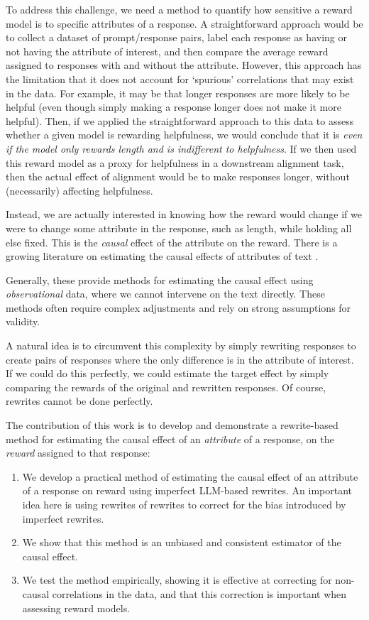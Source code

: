 \documentclass{article}
\begin{document}
To address this challenge, we need a method to quantify how sensitive a reward model is to specific attributes of a response.
A straightforward approach would be to collect a dataset of prompt/response pairs, label each response as having or not having the attribute of interest, and then compare the average reward assigned to responses with and without the attribute. However, this approach has the limitation that it does not account for `spurious' correlations that may exist in the data. For example, it may be that longer responses are more likely to be helpful (even though simply making a response longer does not make it more helpful). Then, if we applied the straightforward approach to this data to assess whether a given model is rewarding helpfulness, we would conclude that it is \emph{even if the model only rewards length and is indifferent to helpfulness}. If we then used this reward model as a proxy for helpfulness in a downstream alignment task, then the actual effect of alignment would be to make responses longer, without (necessarily) affecting helpfulness.

Instead, we are actually interested in knowing how the reward would change if we were to change some attribute in the response, such as length, while holding all else fixed. This is the \emph{causal} effect of the attribute on the reward.
There is a growing literature on estimating the causal effects of attributes of text \citep{feder2022causalinferencenaturallanguage,grimmer2022text, jin-etal-2022-causalnlp, chen2023causal, gui2023causalestimationtextdata}.

Generally, these provide methods for estimating the causal effect using \emph{observational} data, where we cannot intervene on the text directly. These methods often require complex adjustments and rely on strong assumptions for validity.

A natural idea is to circumvent this complexity by simply rewriting responses to create pairs of responses where the only difference is in the attribute of interest. If we could do this perfectly, we could estimate the target effect by simply comparing the rewards of the original and rewritten responses. Of course, rewrites cannot be done perfectly.

The contribution of this work is to develop and demonstrate a rewrite-based method for estimating the causal effect of an \emph{attribute} of a response, on the \emph{reward} assigned to that response:
\begin{enumerate}
  \item We develop a practical method of estimating the causal effect of an attribute of a response on reward using imperfect LLM-based rewrites. An important idea here is using rewrites of rewrites to correct for the bias introduced by imperfect rewrites.
  \item We show that this method is an unbiased and consistent estimator of the causal effect.
  \item We test the method empirically, showing it is effective at correcting for non-causal correlations in the data, and that this correction is important when assessing reward models.
\end{enumerate}
\end{document}
